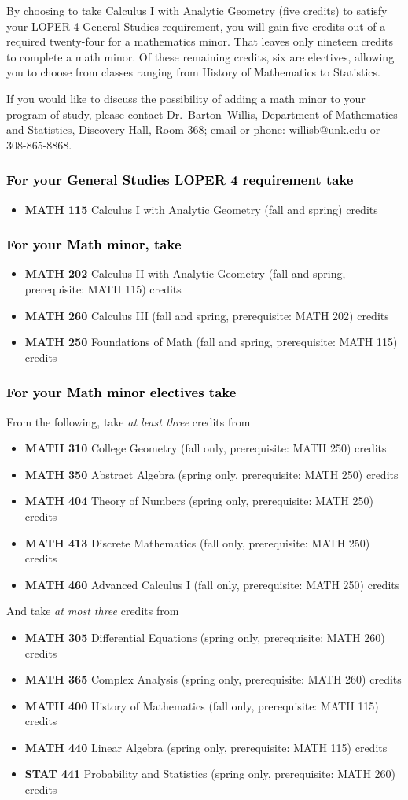 \documentclass[10pt]{article}
\makeatletter
\newcommand{\calcone}{\textbf{MATH 115} Calculus I with Analytic Geometry (fall and spring) \dotfill 5 credits}
\newcommand{\calctwo}{\textbf{MATH 202} Calculus II with Analytic Geometry (fall and spring, prerequisite: MATH 115) \dotfill 5 credits }
\newcommand{\foundations}{\textbf{MATH 250} Foundations of Math (fall and spring, prerequisite: MATH 115)  \dotfill 3 credits}
\newcommand{\calcthree}{\textbf{MATH 260} Calculus III  (fall and spring, prerequisite: MATH 202) \dotfill 5 credits}
\newcommand{\linear}{\textbf{MATH 440} Linear Algebra (spring only, prerequisite: MATH 115) \dotfill 3 credits}
\newcommand{\discrete}{\textbf{MATH 413} Discrete Mathematics  (fall only, prerequisite: MATH 250)\dotfill 3 credits}
\newcommand{\statistics}{\textbf{STAT 441} Probability and Statistics (spring only, prerequisite: MATH 260)  \dotfill  3 credits}
\newcommand{\diffeq}{\textbf{MATH 305}	Differential Equations (spring only, prerequisite: MATH 260) \dotfill 	3 credits}
\newcommand{\abstractalgebra}{\textbf{MATH 350}	Abstract Algebra (spring only, prerequisite: MATH 250) \dotfill 	3 credits}
\newcommand{\complex}{\textbf{MATH 365}	Complex Analysis (spring only,  prerequisite: MATH 260) \dotfill 3 credits}
\newcommand{\advancedcalc}{\textbf{MATH 460}	Advanced Calculus I  (fall only,   prerequisite: MATH 250) \dotfill 3 credits}
\newcommand{\collegegeometry}{\textbf{MATH 310}	College Geometry (fall only,  prerequisite: MATH 250) \dotfill 3 credits}
\newcommand{\mathhistory}{\textbf{MATH 400} History of Mathematics (fall only,  prerequisite: MATH 115) \dotfill 3 credits}
\newcommand{\numbertheory}{\textbf{MATH 404} Theory of Numbers (spring only,  prerequisite: MATH 250) \dotfill 3 credits}
\newcommand{\contactbw}{\mbox{Dr.\ Barton Willis}, Department of Mathematics and Statistics,  Discovery Hall, Room 368;
email or phone: \href{mailto:willisb@unk.edu}{willisb@unk.edu} or 308-865-8868.}
\newcommand{\forinfo}[2]{If you would like to discuss the possibility of adding a math {#1} to your {#2}, please contact \contactbw}
\makeatother
\begin{document}
By choosing to take Calculus I with Analytic Geometry (five credits) to satisfy
your LOPER 4 General Studies requirement, you will gain five credits out of a
required twenty-four for a mathematics minor. That leaves only nineteen credits
to complete a math minor.  Of these remaining credits, six are electives, allowing
you to choose from classes ranging from History of Mathematics to Statistics.


\forinfo{minor}{program of study}


\subsubsection*{\textcolor{black}{For your General Studies LOPER 4 requirement take}}
\begin{itemize}
\item \calcone
\end{itemize}


\subsubsection*{\textcolor{black}{For your Math minor, take}}
\begin{itemize}
  \item \calctwo
  \item \calcthree
\item \foundations
\end{itemize}

\subsubsection*{\textcolor{black}{For your Math minor electives take}}

From the following, take \emph{at least three} credits from
\vspace{0.1in}

\begin{itemize}
\item \collegegeometry
\item \abstractalgebra
\item \numbertheory
\item \discrete
\item \advancedcalc
\end{itemize}

\vspace{0.1in}
\noindent And take \emph{at most  three} credits from
\vspace{0.1in}
\begin{itemize}
\item \diffeq
\item \complex
\item \mathhistory
\item \linear
\item \statistics
\end{itemize}
\end{document}
